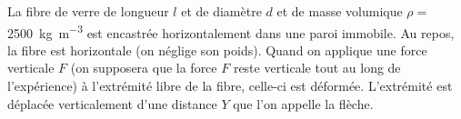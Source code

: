 \begin{Exercise}[title=($*$) Fibre de verre]
  La fibre de verre de longueur $l$ et de diamètre $d$ et de masse volumique
  $\rho=$\SI{2500}{\kg\per\m\cubed} est encastrée horizontalement dans une paroi
  immobile. Au repos, la fibre est horizontale (on néglige son poids). Quand on
  applique une force verticale $F$ (on supposera que la force $F$ reste
  verticale tout au long de l’expérience) à l’extrémité libre de la fibre,
  celle-ci est déformée. L’extrémité est déplacée verticalement d’une distance
  $Y$ que l'on appelle la flèche.
  \begin{center}
\end{center}
\end{Exercise}
